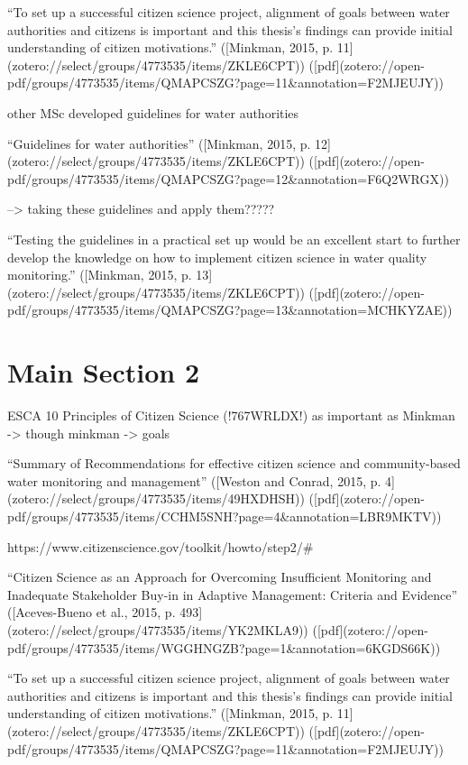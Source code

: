 “To set up a successful citizen science project, alignment of goals between water authorities and citizens is important and this thesis’s findings can provide initial understanding of citizen motivations.” ([Minkman, 2015, p. 11](zotero://select/groups/4773535/items/ZKLE6CPT)) ([pdf](zotero://open-pdf/groups/4773535/items/QMAPCSZG?page=11&annotation=F2MJEUJY))

other MSc developed guidelines for water authorities

“Guidelines for water authorities” ([Minkman, 2015, p. 12](zotero://select/groups/4773535/items/ZKLE6CPT)) ([pdf](zotero://open-pdf/groups/4773535/items/QMAPCSZG?page=12&annotation=F6Q2WRGX))

--> taking these guidelines and apply them?????

“Testing the guidelines in a practical set up would be an excellent start to further develop the knowledge on how to implement citizen science in water quality monitoring.” ([Minkman, 2015, p. 13](zotero://select/groups/4773535/items/ZKLE6CPT)) ([pdf](zotero://open-pdf/groups/4773535/items/QMAPCSZG?page=13&annotation=MCHKYZAE))
\section{Main Section 2}


ESCA 10 Principles of Citizen Science (!767WRLDX!) as important as Minkman -> though minkman -> goals

“Summary of Recommendations for effective citizen science and community-based water monitoring and management” ([Weston and Conrad, 2015, p. 4](zotero://select/groups/4773535/items/49HXDHSH)) ([pdf](zotero://open-pdf/groups/4773535/items/CCHM5SNH?page=4&annotation=LBR9MKTV))

https://www.citizenscience.gov/toolkit/howto/step2/#

“Citizen Science as an Approach for Overcoming Insufficient Monitoring and Inadequate Stakeholder Buy-in in Adaptive Management: Criteria and Evidence” ([Aceves-Bueno et al., 2015, p. 493](zotero://select/groups/4773535/items/YK2MKLA9)) ([pdf](zotero://open-pdf/groups/4773535/items/WGGHNGZB?page=1&annotation=6KGDS66K))

“To set up a successful citizen science project, alignment of goals between water authorities and citizens is important and this thesis’s findings can provide initial understanding of citizen motivations.” ([Minkman, 2015, p. 11](zotero://select/groups/4773535/items/ZKLE6CPT)) ([pdf](zotero://open-pdf/groups/4773535/items/QMAPCSZG?page=11&annotation=F2MJEUJY))

